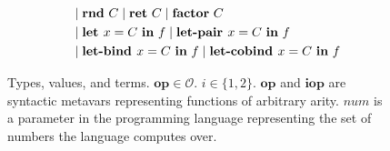 \begin{figure}[tbp]
\begin{alignat*}{3}
         & & &
         \mid \mathbf{rnd}~C 
         \mid \mathbf{ret}~C 
         \mid \mathbf{factor}~C \\ 
         & & &
         \mid \textbf{let } x = C \ \textbf{in} \ f
         \mid \textbf{let-pair } x = C \ \textbf{in} \ f \\
         & & &
         \mid \textbf{let-bind } x = C \ \textbf{in} \ f
         \mid \textbf{let-cobind } x = C \ \textbf{in} \ f \\
  \end{alignat*}
  \caption{
    Types, values, and terms. $\mathbf{op} \in \mathcal{O}$. $i \in \{1, 2\}$.
    $\textbf{op}$ and $\textbf{iop}$ are syntactic metavars representing
    functions of arbitrary arity.
    $\textit{num}$ is a parameter in the programming language representing the
    set of numbers the language computes over.
  }
  \label{fig:syntax}
\end{figure}
